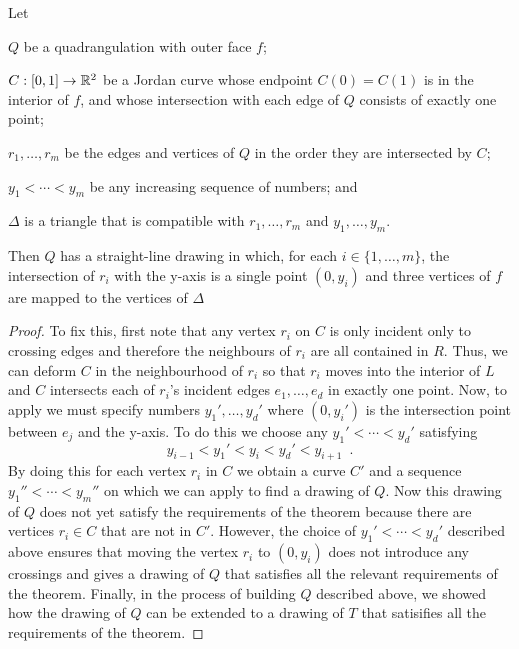 \documentclass{patmorin}
\begin{document}
\begin{lem}
    Let
    \begin{compactitem}
    \item $Q$ be a quadrangulation with outer face $f$; 
    \item $C:[0,1]\to\mathbb{R}^2$ be a Jordan curve
     whose endpoint $C(0)=C(1)$ is in the interior of $f$, and
     whose intersection with each edge of $Q$
     consists of exactly one point;
    \item $r_1,\ldots,r_m$ be the edges and vertices of $Q$ in the
    order they are intersected by $C$; 
    \item $y_1<\cdots<y_m$
    be any increasing sequence of numbers; and
    \item $\Delta$ is a triangle that is compatible with $r_1,\ldots,r_m$ and $y_1,\ldots,y_m$.
    \end{compactitem}
    Then $Q$ has a straight-line
    drawing in which, for each $i\in\{1,\ldots,m\}$, the intersection
    of $r_i$ with the y-axis is a single point $(0,y_i)$ and three vertices
    of $f$ are mapped to the vertices of $\Delta$
\end{lem}

\begin{proof}
   To fix this, first note that any vertex $r_i$ on $C$ is only incident
   only to crossing edges and therefore the neighbours of $r_i$ are all
   contained in $R$. Thus, we can deform $C$ in the neighbourhood of $r_i$
   so that $r_i$ moves into the interior of $L$ and $C$ intersects each
   of $r_i$'s incident edges $e_1,\ldots,e_d$ in exactly one point.  Now,
   to apply  we must specify numbers $y_1',\ldots,y_d'$ where
   $(0,y_i')$ is the intersection point between $e_j$ and the y-axis.
   To do this we choose any $y_1'<\cdots<y_d'$ satisfying
   \[
       y_{i-1} < y_1' < y_i < y_d' < y_{i+1} \enspace .
   \]
   By doing this for each vertex $r_i$ in $C$ we obtain a curve $C'$ and
   a sequence $y_1''<\cdots<y_m''$ on which we can apply  to
   find a drawing of $Q$.  Now this drawing of $Q$ does not yet satisfy
   the requirements of the theorem because there are vertices $r_i\in
   C$ that are not in $C'$. However, the choice of $y_1'<\cdots<y_d'$
   described above ensures that moving the vertex $r_i$ to $(0,y_i)$
   does not introduce any crossings and gives a drawing of $Q$ that
   satisfies all the relevant requirements of the theorem.  Finally,
   in the process of building $Q$ described above, we showed how the
   drawing of $Q$ can be extended to a drawing of $T$ that satisifies
   all the requirements of the theorem.
\end{proof}
\end{document}
